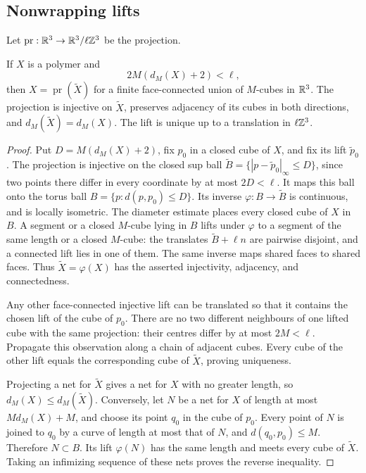 \subsection{Nonwrapping lifts}\label{subsec:polymer-lifts}

Let $\operatorname{pr}:\mathbb R^3\to\mathbb R^3/\ell\mathbb Z^3$ be the projection.
\begin{proposition}\label{prop:nonwrapping-polymer-lift}
If $X$ is a polymer and
\begin{equation}\label{eq:nonwrapping-polymer-condition}
 2M(d_M(X)+2)<\ell,
\end{equation}
then $X=\operatorname{pr}(\widetilde X)$ for a finite face-connected
union of $M$-cubes in $\mathbb R^3$. The projection is injective on
$\widetilde X$, preserves adjacency of its cubes in both directions,
and $d_M(\widetilde X)=d_M(X)$. The lift is unique up to a translation
in $\ell\mathbb Z^3$.
\end{proposition}

\begin{proof}
Put $D=M(d_M(X)+2)$, fix $p_0$ in a closed cube of $X$, and fix its
lift $\widetilde p_0$. The projection is injective on the closed sup
ball $\widetilde B=\{|p-\widetilde p_0|_\infty\le D\}$, since two
points there differ in every coordinate by at most $2D<\ell$.
It maps this ball onto the torus ball $B=\{p:d(p,p_0)\le D\}$.
Its inverse $\varphi:B\to\widetilde B$ is continuous, and is locally
isometric. The diameter estimate places every closed cube of $X$ in
$B$. A segment or a closed $M$-cube lying in $B$ lifts under
$\varphi$ to a segment of the same length or a closed $M$-cube:
the translates $\widetilde B+\ell n$ are pairwise disjoint, and a
connected lift lies in one of them. The same inverse maps shared
faces to shared faces. Thus $\widetilde X=\varphi(X)$ has the
asserted injectivity, adjacency, and connectedness.

Any other face-connected injective lift can be translated so that it
contains the chosen lift of the cube of $p_0$. There are no two
different neighbours of one lifted cube with the same projection:
their centres differ by at most $2M<\ell$. Propagate this observation
along a chain of adjacent cubes. Every cube of the other lift equals
the corresponding cube of $\widetilde X$, proving uniqueness.

Projecting a net for $\widetilde X$ gives a net for $X$ with no greater
length, so $d_M(X)\le d_M(\widetilde X)$. Conversely, let $N$ be a
net for $X$ of length at most $Md_M(X)+M$, and choose its point $q_0$
in the cube of $p_0$. Every point of $N$ is joined to $q_0$ by a
curve of length at most that of $N$, and $d(q_0,p_0)\le M$.
Therefore $N\subset B$. Its lift $\varphi(N)$ has the same length
and meets every cube of $\widetilde X$. Taking an infimizing sequence
of these nets proves the reverse inequality.
\end{proof}

\printbibliography

